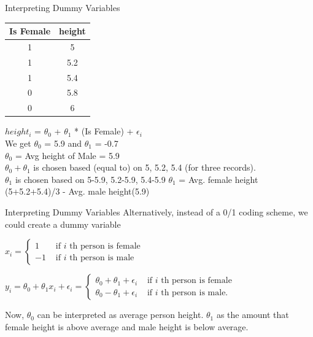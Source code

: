 \documentclass{beamer}
\begin{document}
    \begin{frame}{Interpreting Dummy Variables}
    \begin{center}
        \pause \begin{tabular}{c|c}
            Is Female& height\\
            \hline
            \hline
            1 & 5 \\
            1 & 5.2 \\
            1 & 5.4 \\
            0 & 5.8 \\
            0 & 6 \\
        \end{tabular}
    \end{center}
    \pause $height_{i}$ = $\theta_{0}$ + $\theta_{1}$ *  (Is Female) + $\epsilon_{i}$\\
    \vspace{1em}
    \pause We get $\theta_0$ = 5.9 and $\theta_1$ = -0.7\\
    \pause $\theta_{0}$ = Avg height of Male = 5.9\\
    \pause $\theta_{0} + \theta_{1}$ is chosen based (equal to) on 5, 5.2, 5.4 (for three records). \\
    \pause $\theta_{1}$ is chosen based on 5-5.9, 5.2-5.9, 5.4-5.9
    \pause $\theta_{1}$ = Avg. female height (5+5.2+5.4)/3 - Avg. male height(5.9)
    \end{frame}
    
    \begin{frame}{Interpreting Dummy Variables}
    Alternatively, instead of a 0/1 coding scheme, we could create a dummy variable
    
    \pause \(x_{i}=\left\{\begin{array}{ll}{1} & {\text { if } i \text { th person is female }} \\ {-1} & {\text { if } i \text { th person is male }}\end{array}\right.\)
    
    \pause \(y_{i}=\theta_{0}+\theta_{1} x_{i}+\epsilon_{i}=\left\{\begin{array}{ll}{\theta_{0}+\theta_{1}+\epsilon_{i}} & {\text { if } i \text { th person is female }} \\ {\theta_{0}-\theta_{1}+\epsilon_{i}} & {\text { if } i \text { th person is male. }}\end{array}\right.\)
    
    
    \pause Now, $\theta_{0}$ can be interpreted as average person height. $\theta_{1}$ as the amount that female height is above average and male height is below average.
    \end{frame}
\end{document}
